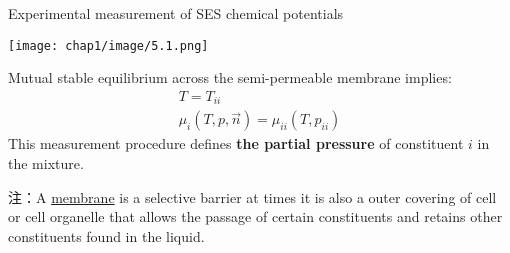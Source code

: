 \begin{example}
    Experimental measurement of SES chemical potentials

    \begin{minipage}{0.45\textwidth}
        \texttt{[image: chap1/image/5.1.png]}
    \end{minipage}
    \begin{minipage}{0.45\textwidth}
        \vspace*{0pt} 
        \parbox[t]{\linewidth}{ 
            Mutual stable equilibrium across the semi-permeable membrane implies:
            \begin{gather*}
                T = T_{ii}\\
                \mu_i(T,p,\vec{n})=\mu_{ii}(T,p_{ii})
            \end{gather*}
            This measurement procedure defines \textbf{the partial pressure} of constituent \(i\) in the mixture.
        }
    \end{minipage}

    \textcolor{b1}{注：}A \href{https://www.zhihu.com/question/26131215/answer/32303725}{membrane} is a selective barrier at times 
    it is also a outer covering of cell or cell organelle that allows 
    the passage of certain constituents and 
    retains other constituents found in the liquid.

\end{example}
